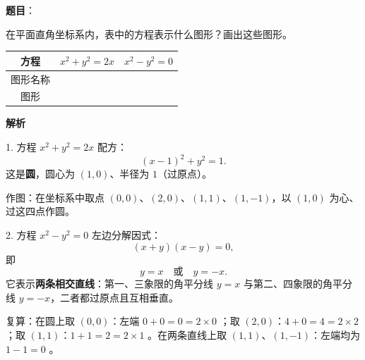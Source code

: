 \begin{answer}

\textbf{题目}：

在平面直角坐标系内，表中的方程表示什么图形？画出这些图形。

\begin{center}
\begin{tabular}{cll}
\toprule
方程 & $x^2+y^2=2x$ & $x^2-y^2=0$ \\
\midrule
图形名称 &  &  \\
图形 &  &  \\
\bottomrule
\end{tabular}
\end{center}

\textbf{解析}

1. 方程 $x^2+y^2=2x$ 配方：
\nopagebreak[4]
\[
(x-1)^2+y^2=1.
\]
这是\textbf{圆}，圆心为 $(1,0)$、半径为 $1$（过原点）。

作图：在坐标系中取点 $(0,0)$、$(2,0)$、$(1,1)$、$(1,-1)$，以 $(1,0)$ 为心、过这四点作圆。

2. 方程 $x^2-y^2=0$ 左边分解因式：
\nopagebreak[4]
\[
(x+y)(x-y)=0,
\]
即
\nopagebreak[4]
\[
y=x\quad\text{或}\quad y=-x.
\]
它表示\textbf{两条相交直线}：第一、三象限的角平分线 $y=x$ 与第二、四象限的角平分线 $y=-x$，二者都过原点且互相垂直。

复算：在圆上取 $(0,0)$：左端 $0+0=0=2\times0$ ；取 $(2,0)$：$4+0=4=2\times2$ ；取 $(1,1)$：$1+1=2=2\times1$ 。在两条直线上取 $(1,1)$、$(1,-1)$：左端均为 $1-1=0$ 。


\end{answer}

